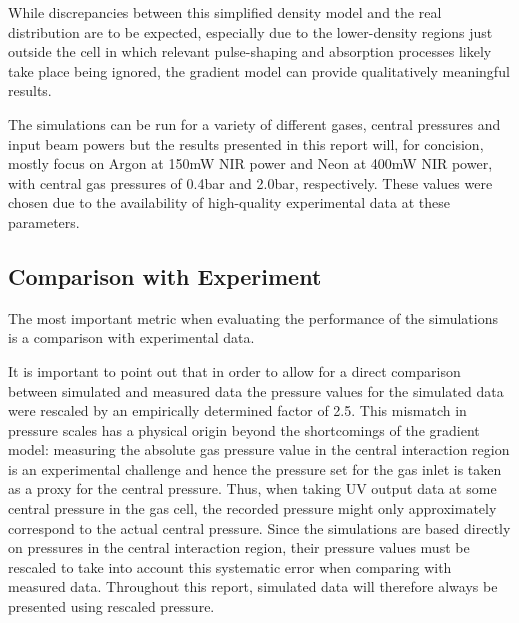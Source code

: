 \documentclass[a4paper]{jpconf}
\begin{document}
While discrepancies between this simplified density model and the real distribution are to be expected, especially due to the lower-density regions just outside the cell in which relevant pulse-shaping and absorption processes likely take place being ignored, the gradient model can provide qualitatively meaningful results. \par 
The simulations can be run for a variety of different gases, central pressures and input beam powers but the results presented in this report will, for concision, mostly focus on Argon at 150mW NIR power and Neon at 400mW NIR power, with central gas pressures of 0.4bar and 2.0bar, respectively. These values were chosen due to the availability of high-quality experimental data at these parameters. 

\subsection{Comparison with Experiment}
The most important metric when evaluating the performance of the simulations is a comparison with experimental data. \par 
It is important to point out that in order to allow for a direct comparison between simulated and measured data the pressure values for the simulated data were rescaled by an empirically determined factor of 2.5. This mismatch in pressure scales has a physical origin beyond the shortcomings of the gradient model: measuring the absolute gas pressure value in the central interaction region is an experimental challenge and hence the pressure set for the gas inlet is taken as a proxy for the central pressure. Thus, when taking UV output data at some central pressure in the gas cell, the recorded pressure  might only approximately correspond to the actual central pressure. Since the simulations are based directly on pressures in the central interaction region, their pressure values must be rescaled to take into account this systematic error when comparing with measured data. Throughout this report, simulated data will therefore always be presented using rescaled pressure. \par 
\end{document}
